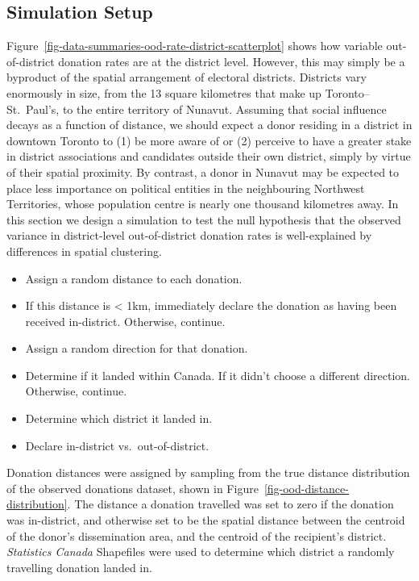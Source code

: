 \documentclass[
  letterpaper,
  DIV=11,
  numbers=noendperiod]{scrartcl}
\providecommand{\tightlist}{%
  \setlength{\itemsep}{0pt}\setlength{\parskip}{0pt}}
\begin{document}
\subsection{Simulation Setup}\label{simulation-setup}

Figure~\ref{fig-data-summaries-ood-rate-district-scatterplot} shows how
variable out-of-district donation rates are at the district level.
However, this may simply be a byproduct of the spatial arrangement of
electoral districts. Districts vary enormously in size, from the 13
square kilometres that make up Toronto--St.~Paul's, to the entire
territory of Nunavut. Assuming that social influence decays as a
function of distance, we should expect a donor residing in a district in
downtown Toronto to (1) be more aware of or (2) perceive to have a
greater stake in district associations and candidates outside their own
district, simply by virtue of their spatial proximity. By contrast, a
donor in Nunavut may be expected to place less importance on political
entities in the neighbouring Northwest Territories, whose population
centre is nearly one thousand kilometres away. In this section we design
a simulation to test the null hypothesis that the observed variance in
district-level out-of-district donation rates is well-explained by
differences in spatial clustering.

\begin{itemize}
\tightlist
\item
  Assign a random distance to each donation.
\item
  If this distance is \textless{} 1km, immediately declare the donation
  as having been received in-district. Otherwise, continue.
\item
  Assign a random direction for that donation.
\item
  Determine if it landed within Canada. If it didn't choose a different
  direction. Otherwise, continue.
\item
  Determine which district it landed in.
\item
  Declare in-district vs.~out-of-district.
\end{itemize}

Donation distances were assigned by sampling from the true distance
distribution of the observed donations dataset, shown in
Figure~\ref{fig-ood-distance-distribution}. The distance a donation
travelled was set to zero if the donation was in-district, and otherwise
set to be the spatial distance between the centroid of the donor's
dissemination area, and the centroid of the recipient's district.
\emph{Statistics Canada} Shapefiles were used to determine which
district a randomly travelling donation landed in.
\end{document}
